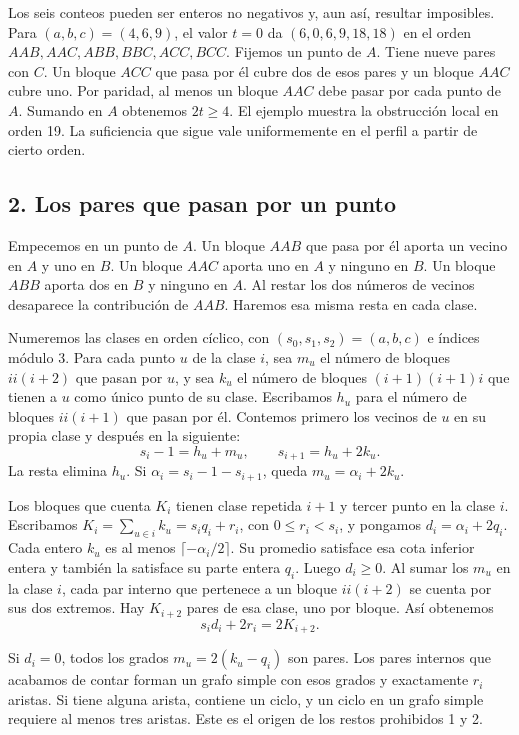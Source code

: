 \documentclass[spanish,11pt,a4paper]{article}
\begin{document}
Los seis conteos pueden ser enteros no negativos y, aun así, resultar imposibles. Para \((a,b,c)=(4,6,9)\), el valor \(t=0\) da \((6,0,6,9,18,18)\) en el orden \(AAB,AAC,ABB,BBC,ACC,BCC\). Fijemos un punto de \(A\). Tiene nueve pares con \(C\). Un bloque \(ACC\) que pasa por él cubre dos de esos pares y un bloque \(AAC\) cubre uno. Por paridad, al menos un bloque \(AAC\) debe pasar por cada punto de \(A\). Sumando en \(A\) obtenemos \(2t\ge4\). El ejemplo muestra la obstrucción local en orden 19. La suficiencia que sigue vale uniformemente en el perfil a partir de cierto orden.

\subsection{2. Los pares que pasan por un punto}\label{los-pares-que-pasan-por-un-punto}

Empecemos en un punto de \(A\). Un bloque \(AAB\) que pasa por él aporta un vecino en \(A\) y uno en \(B\). Un bloque \(AAC\) aporta uno en \(A\) y ninguno en \(B\). Un bloque \(ABB\) aporta dos en \(B\) y ninguno en \(A\). Al restar los dos números de vecinos desaparece la contribución de \(AAB\). Haremos esa misma resta en cada clase.

Numeremos las clases en orden cíclico, con \((s_0,s_1,s_2)=(a,b,c)\) e índices módulo 3. Para cada punto \(u\) de la clase \(i\), sea \(m_u\) el número de bloques \(ii(i+2)\) que pasan por \(u\), y sea \(k_u\) el número de bloques \((i+1)(i+1)i\) que tienen a \(u\) como único punto de su clase. Escribamos \(h_u\) para el número de bloques \(ii(i+1)\) que pasan por él. Contemos primero los vecinos de \(u\) en su propia clase y después en la siguiente: \[s_i-1=h_u+m_u,\qquad s_{i+1}=h_u+2k_u.\] La resta elimina \(h_u\). Si \(\alpha_i=s_i-1-s_{i+1}\), queda \(m_u=\alpha_i+2k_u\).

Los bloques que cuenta \(K_i\) tienen clase repetida \(i+1\) y tercer punto en la clase \(i\). Escribamos \(K_i=\sum_{u\in i}k_u=s_iq_i+r_i\), con \(0\le r_i<s_i\), y pongamos \(d_i=\alpha_i+2q_i\). Cada entero \(k_u\) es al menos \(\lceil-\alpha_i/2\rceil\). Su promedio satisface esa cota inferior entera y también la satisface su parte entera \(q_i\). Luego \(d_i\ge0\). Al sumar los \(m_u\) en la clase \(i\), cada par interno que pertenece a un bloque \(ii(i+2)\) se cuenta por sus dos extremos. Hay \(K_{i+2}\) pares de esa clase, uno por bloque. Así obtenemos \[s_id_i+2r_i=2K_{i+2}.\]

Si \(d_i=0\), todos los grados \(m_u=2(k_u-q_i)\) son pares. Los pares internos que acabamos de contar forman un grafo simple con esos grados y exactamente \(r_i\) aristas. Si tiene alguna arista, contiene un ciclo, y un ciclo en un grafo simple requiere al menos tres aristas. Este es el origen de los restos prohibidos 1 y 2.
\end{document}
